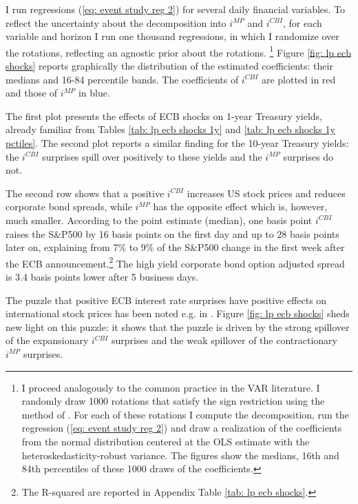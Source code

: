 \documentclass[a4paper,12pt]{article}
\begin{document}
I run regressions (\ref{eq: event study reg 2}) for several daily financial variables.
To reflect the uncertainty about the decomposition into $i^{MP}$ and $i^{CBI}$,
for each variable and horizon I run one thousand regressions, in which I randomize over the rotations, reflecting an agnostic prior about the rotations.%
\footnote{I proceed analogously to the common practice in the VAR literature. I randomly draw 1000 rotations that satisfy the sign restriction using the method of \cite{Rubio_Waggoner_Zha_2010}. For each of these rotations I compute the decomposition, run the regression (\ref{eq: event study reg 2}) and draw a realization of the coefficients from the normal distribution centered at the OLS estimate with the heteroskedasticity-robust variance. The figures show the medians, 16th and 84th percentiles of these 1000 draws of the coefficients.}
Figure \ref{fig: lp ecb shocks} reports graphically the distribution of the estimated coefficients: their medians and 16-84 percentile bands.
The coefficients of $i^{CBI}$ are plotted in red and those of $i^{MP}$ in blue.

The first plot presents the effects of ECB shocks on 1-year Treasury yields,
already familiar from Tables \ref{tab: lp ecb shocks 1y} and \ref{tab: lp ecb shocks 1y pctiles}.
The second plot reports a similar finding for the 10-year Treasury yields: the $i^{CBI}$ surprises spill over positively to these yields and the $i^{MP}$ surprises do not.

The second row shows that a positive $i^{CBI}$ increases US stock prices and reduces corporate bond spreads,
while $i^{MP}$ has the opposite effect which is, however, much smaller.
According to the point estimate (median), one basis point $i^{CBI}$ raises the S\&P500 by 16 basis points on the first day and up to 28 basis points later on, explaining from 7\% to 9\% of  the S\&P500 change in the first week after the ECB announcement.\footnote{%
The R-squared are reported in Appendix Table \ref{tab: lp ecb shocks}.}
The high yield corporate bond option adjusted spread is 3.4 basis points lower after 5 business days.

The puzzle that positive ECB interest rate surprises have positive effects on international stock prices 
has been noted e.g. in \cite{Brusa_etal_2020}. Figure \ref{fig: lp ecb shocks} sheds new light on this puzzle: it shows
that the puzzle is driven by the strong spillover of the expansionary $i^{CBI}$ surprises and the weak spillover of the contractionary $i^{MP}$ surprises.
\end{document}
